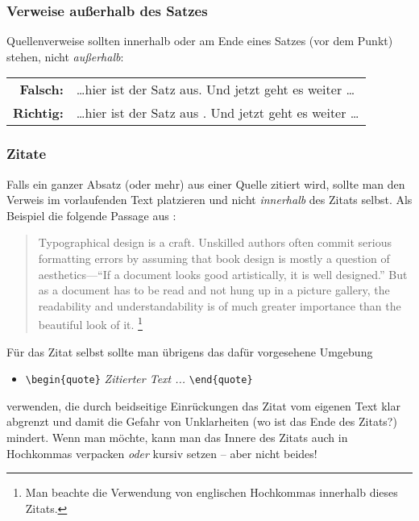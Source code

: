 \subsubsection{Verweise außerhalb des Satzes}
Quellenverweise sollten innerhalb oder am Ende eines Satzes (vor
dem Punkt) stehen, nicht \emph{außerhalb}:
%
\begin{center}
\begin{tabular}{rl}
 \textbf{Falsch:}  & \ldots hier ist der Satz aus. \cite{Oetiker01} Und jetzt geht es weiter \ldots \\
 \textbf{Richtig:} & \ldots hier ist der Satz aus \cite{Oetiker01}. Und jetzt geht es weiter \ldots
\end{tabular}
\end{center}

\subsubsection{Zitate}
Falls ein ganzer Absatz (oder mehr) aus einer Quelle zitiert wird,
sollte man den Verweis im vorlaufenden Text platzieren und nicht
\emph{innerhalb} des Zitats selbst. Als Beispiel die folgende Passage
aus \cite{Oetiker01}:
\begin{quote}
Typographical design is a craft. Unskilled authors often commit
serious formatting errors by assuming that book design is mostly a
question of aesthetics---``If a document looks good artistically,
it is well designed.'' But as a document has to be read and not
hung up in a picture gallery, the readability and
understandability is of much greater importance than the beautiful
look of it.%
\footnote{Man beachte die Verwendung von englischen Hochkommas innerhalb dieses
Zitats.}
\end{quote}
Für das Zitat selbst sollte man übrigens das dafür vorgesehene Umgebung
%
\begin{itemize}
 \item[] \verb!\begin{quote}! \emph{Zitierter Text ...} \verb!\end{quote}!
\end{itemize}
%
verwenden, die durch beidseitige Einrückungen das
Zitat vom eigenen Text klar abgrenzt und damit die Gefahr von
Unklarheiten (wo ist das Ende des Zitats?) mindert.
Wenn man möchte, kann man das Innere des Zitats auch in Hochkommas verpacken 
\emph{oder} kursiv setzen -- aber nicht beides!





